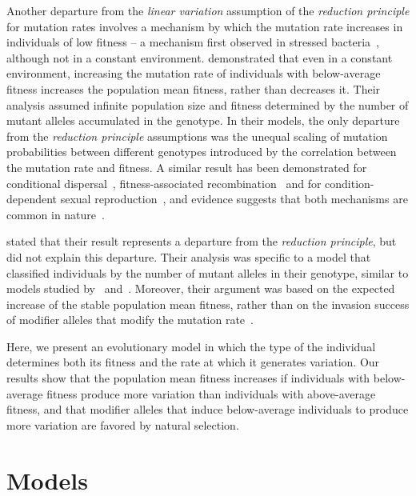 \documentclass[9pt, a4paper, twocolumn]{extarticle}
\begin{document}
Another departure from the \emph{linear variation} assumption of the \emph{reduction principle} for mutation rates involves a mechanism by which the mutation rate increases in individuals of low fitness -- a mechanism first observed in stressed bacteria~\citep{Foster2007}, although not in a constant environment.
\citet{Ram2012} demonstrated that even in a constant environment, increasing the mutation rate of individuals with below-average fitness increases the population mean fitness, rather than decreases it.
Their analysis assumed  infinite population size and fitness  determined by the number of mutant alleles accumulated in the genotype.
In their models, the only departure from the \emph{reduction principle} assumptions was the unequal scaling of mutation probabilities between different genotypes introduced by the correlation between the mutation rate and fitness.
A similar result has been demonstrated for conditional dispersal~\citep[Th.~39]{Altenberg2012b}, fitness-associated recombination~\citep{Hadany2003a} and for condition-dependent sexual reproduction~\citep{Hadany2007a}, and evidence suggests that both mechanisms are common in nature~\citep{Ram2016}.

\citet{Ram2012} stated that their result represents a departure from the \emph{reduction principle}, but did not explain this departure.
Their analysis was specific to a model that classified individuals by the number of mutant alleles in their genotype, similar to models studied by~\citet{Kimura1966a} and~\citet{Haigh1978}.
Moreover, their argument was based on the expected increase of the stable population mean fitness, rather than on the invasion success of modifier alleles that modify the mutation rate~\citep[i.e., analysis of \emph{evolutionary genetic stability}, see][]{Eshel1982, Lessard1990}.

Here, we present an evolutionary model in which the type of the individual determines both its fitness and the rate at which it generates variation.
Our results show that the population mean fitness increases if individuals with below-average fitness produce more variation than individuals with above-average fitness,
and that modifier alleles that induce below-average individuals to produce more variation are favored by natural selection.

\section*{Models}\label{sec:models}
\end{document}
